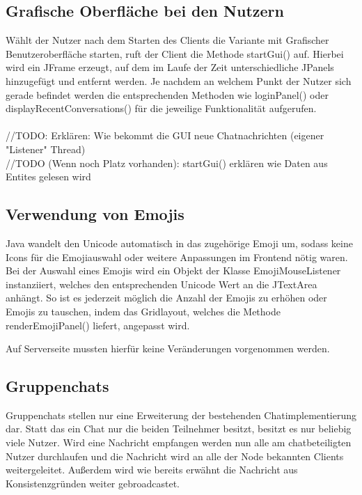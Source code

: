 
\author{Jan Grübener, Patrick Mischka}
\subsection{Grafische Oberfläche bei den Nutzern}
Wählt der Nutzer nach dem Starten des Clients die Variante mit Grafischer Benutzeroberfläche starten, ruft der Client die Methode startGui() auf. Hierbei wird ein JFrame erzeugt, auf dem im Laufe der Zeit unterschiedliche JPanels hinzugefügt und entfernt werden. Je nachdem an welchem Punkt der Nutzer sich gerade befindet werden die entsprechenden Methoden wie loginPanel() oder displayRecentConversations() für die jeweilige Funktionalität aufgerufen. \\ \\
//TODO: Erklären: Wie bekommt die GUI neue Chatnachrichten (eigener "Listener" Thread) \\
//TODO (Wenn noch Platz vorhanden): startGui() erklären wie Daten aus Entites gelesen wird
\author{Jan Grübener, Patrick Mischka}
\subsection{Verwendung von Emojis}
Java wandelt den Unicode automatisch in das zugehörige Emoji um, sodass keine Icons für die Emojiauswahl oder weitere Anpassungen im Frontend nötig waren. Bei der Auswahl eines Emojis wird ein Objekt der Klasse EmojiMouseListener instanziiert, welches den entsprechenden Unicode Wert an die JTextArea anhängt. So ist es jederzeit möglich die Anzahl der Emojis zu erhöhen oder Emojis zu tauschen, indem das Gridlayout, welches die Methode renderEmojiPanel() liefert, angepasst wird.

Auf Serverseite mussten hierfür keine Veränderungen vorgenommen werden.

\author{Matthias Vonend, Aaron Schweig, Troy Keßler}
\subsection{Gruppenchats}
Gruppenchats stellen nur eine Erweiterung der bestehenden Chatimplementierung dar. Statt das ein Chat nur die beiden Teilnehmer besitzt, besitzt es nur beliebig viele Nutzer. Wird eine Nachricht empfangen werden nun alle am chatbeteiligten Nutzer durchlaufen und die Nachricht wird an alle der Node bekannten Clients weitergeleitet. Außerdem wird wie bereits erwähnt die Nachricht aus Konsistenzgründen weiter gebroadcastet.

